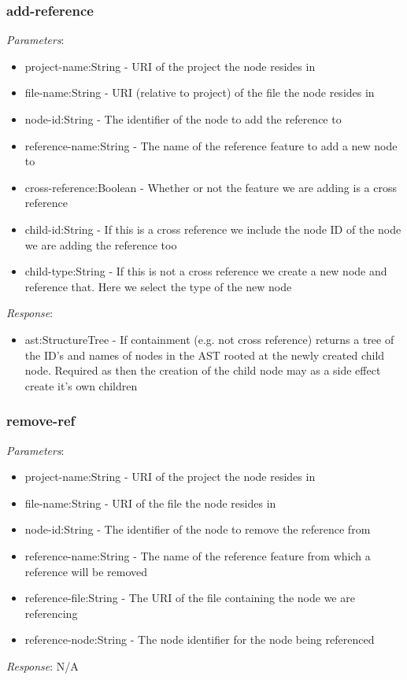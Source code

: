 \subsubsection{add-reference}
\emph{Parameters}: 
\begin{itemize}
\item project-name:String - URI of the project the node resides in
\item file-name:String - URI (relative to project) of the file the node resides in
\item node-id:String - The identifier of the node to add the reference to
\item reference-name:String - The name of the reference feature to add a new node to
\item cross-reference:Boolean - Whether or not the feature we are adding is a cross reference
\item child-id:String - If this is a cross reference we include the node ID of the node we are adding the reference too
\item child-type:String - If this is not a cross reference we create a new node and reference that. Here we select the type of the new node
\end{itemize}
\emph{Response}: 
\begin{itemize}
\item ast:StructureTree - If containment (e.g. not cross reference) returns a tree of the ID's and names of nodes in the AST rooted at the newly created child node. Required as then the creation of the child node may as a side effect create it's own children
\end{itemize}

\subsubsection{remove-ref}
\emph{Parameters}: 
\begin{itemize}
\item project-name:String - URI of the project the node resides in
\item file-name:String - URI of the file the node resides in
\item node-id:String - The identifier of the node to remove the reference from
\item reference-name:String - The name of the reference feature from which a reference will be removed
\item reference-file:String - The URI of the file containing the node we are referencing
\item reference-node:String - The node identifier for the node being referenced
\end{itemize}
\emph{Response}: N/A

